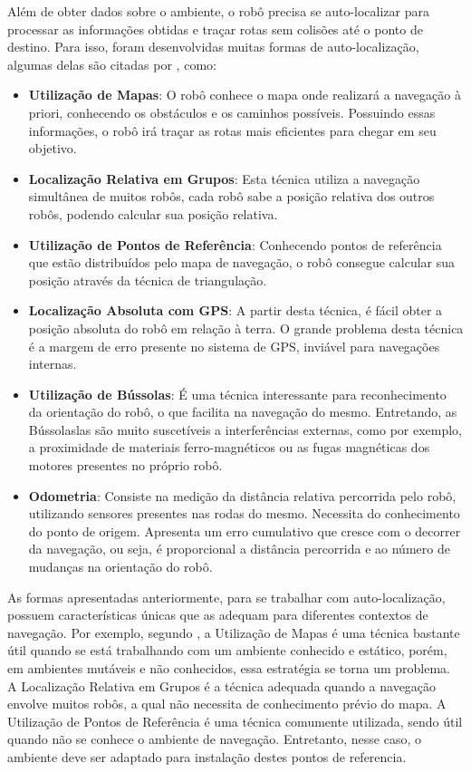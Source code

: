 	Além de obter dados sobre o ambiente, o robô precisa se auto-localizar para processar as informações obtidas e traçar rotas sem colisões até o ponto de destino. Para isso, foram desenvolvidas muitas formas de auto-localização, algumas delas são citadas por \cite{roboBulldozerIV}, como:

	\begin{itemize}
		\item \textbf{Utilização de Mapas}: O robô conhece o mapa onde realizará a navegação à priori, conhecendo os obstáculos e os caminhos possíveis. Possuindo essas informações, o robô irá traçar as rotas mais eficientes para chegar em seu objetivo.

		\item \textbf{Localização Relativa em Grupos}: Esta técnica utiliza a navegação simultânea de muitos robôs, cada robô sabe a posição relativa dos outros robôs, podendo calcular sua posição relativa.

		\item \textbf{Utilização de Pontos de Referência}: Conhecendo pontos de referência que estão distribuídos pelo mapa de navegação, o robô consegue calcular sua posição através da técnica de triangulação.

		\item \textbf{Localização Absoluta com GPS}: A partir desta técnica, é fácil obter a posição absoluta do robô em relação à terra. O grande problema desta técnica é a margem de erro presente no sistema de GPS, inviável para navegações internas.

		\item \textbf{Utilização de Bússolas}: É uma técnica interessante para reconhecimento da orientação do robô, o que facilita na navegação do mesmo. Entretando, as Bússolaslas são muito suscetíveis a interferências externas, como por exemplo, a proximidade de materiais ferro-magnéticos ou as fugas magnéticas dos motores presentes no próprio robô.

		\item \textbf{Odometria}: Consiste na medição da distância relativa percorrida pelo robô, utilizando sensores presentes nas rodas do mesmo. Necessita do conhecimento do ponto de origem. Apresenta um erro cumulativo que cresce com o decorrer da navegação, ou seja, é proporcional a distância percorrida e ao número de mudanças na orientação do robô.

	\end{itemize}

	As formas apresentadas anteriormente, para se trabalhar com auto-localização, possuem características únicas que as adequam para diferentes contextos de navegação. Por exemplo, segundo \cite{roboBulldozerIV}, a Utilização de Mapas é uma técnica bastante útil quando se está trabalhando com um ambiente conhecido e estático, porém, em ambientes mutáveis e não conhecidos, essa estratégia se torna um problema. A Localização Relativa em Grupos é a técnica adequada quando a navegação envolve muitos robôs, a qual não necessita de conhecimento prévio do mapa. A Utilização de Pontos de Referência é uma técnica comumente utilizada, sendo útil quando não se conhece o ambiente de navegação. Entretanto, nesse caso, o ambiente deve ser adaptado para instalação destes pontos de referencia.

